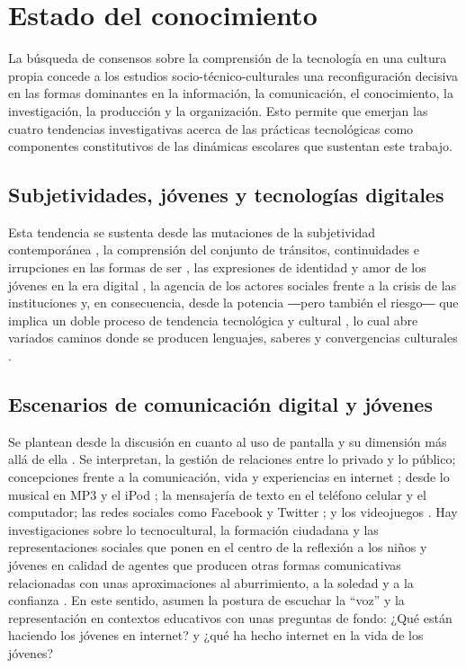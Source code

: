\documentclass[spanish]{textolivre}
\begin{document}
\section{Estado del conocimiento}\label{sec-estado}
La búsqueda de consensos sobre la comprensión de la tecnología en una cultura propia concede a los estudios socio-técnico-culturales \cite{levy_cibercultura._2007} una reconfiguración decisiva en las formas dominantes en la información, la comunicación, el conocimiento, la investigación, la producción y la organización. Esto permite que emerjan las cuatro tendencias investigativas acerca de las prácticas tecnológicas como componentes constitutivos de las dinámicas escolares que sustentan este trabajo.

\subsection{Subjetividades, jóvenes y tecnologías digitales}\label{sec-subjetividades}
Esta tendencia se sustenta desde las mutaciones de la subjetividad contemporánea \cite{amador_mutaciones_2010, erazo_caicedo_mediaciones_2006}, la comprensión del conjunto de tránsitos, continuidades e irrupciones en las formas de ser \cite{acosta_juventud_2012, mejia_tecnologi_2004, rueda_ortiz_cibercultura:_2008}, las expresiones de identidad y amor de los jóvenes en la era digital \cite{richardson_promposal:_2017}, la agencia de los actores sociales frente a la crisis de las instituciones y, en consecuencia, desde la potencia ―pero también el riesgo― que implica un doble proceso de tendencia tecnológica y cultural \cite{odgers_adolescent_2020, rueda_ortiz_convergencia_2009}, lo cual abre variados caminos donde se producen lenguajes, saberes y convergencias culturales \cite{munoz_culturas_2010a}.

\subsection{Escenarios de comunicación digital y jóvenes}\label{sec-escenarios}
Se plantean desde la discusión en cuanto al uso de pantalla y su dimensión más allá de ella \cite{munoz_2010c}. Se interpretan, la gestión de relaciones entre lo privado y lo público; concepciones frente a la comunicación, vida y experiencias en internet \cite{fonseca_redes_2015}; desde lo musical en MP3 y el iPod \cite{pelaez_coleccion_2010}; la mensajería de texto en el teléfono celular \cite{galindo_mensajerien_2010} y el computador; las redes sociales como Facebook y Twitter \cite{menzies_case_2017, munoz_redes_2010b}; y los videojuegos \cite{alba_pegados_2010}. Hay investigaciones sobre lo tecnocultural, la formación ciudadana y las representaciones sociales que ponen en el centro de la reflexión a los niños y jóvenes en calidad de agentes que producen otras formas comunicativas relacionadas con unas aproximaciones al aburrimiento, a la soledad y a la confianza \cite{soler_fonseca_confianza_2016}. En este sentido, asumen la postura de escuchar la “voz” y la representación en contextos educativos \cite{dahya_critical_2017} con unas preguntas de fondo: ¿Qué están haciendo los jóvenes en internet? y ¿qué ha hecho internet en la vida de los jóvenes?
\end{document}
